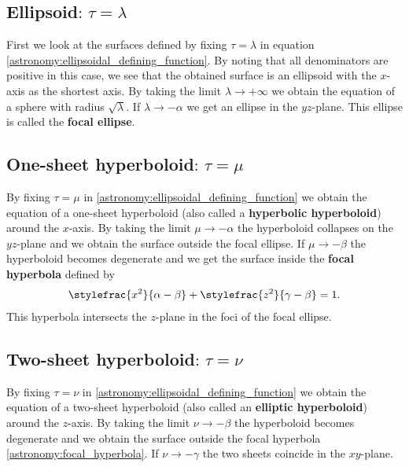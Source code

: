 \subsection{Ellipsoid\texorpdfstring{$\text{: }\tau = \lambda$}{}}

    First we look at the surfaces defined by fixing $\tau=\lambda$ in equation \ref{astronomy:ellipsoidal_defining_function}. By noting that all denominators are positive in this case, we see that the obtained surface is an ellipsoid with the $x$-axis as the shortest axis. By taking the limit $\lambda\rightarrow+\infty$ we obtain the equation of a sphere with radius $\sqrt{\lambda}$. If $\lambda\rightarrow-\alpha$ we get an ellipse in the $yz$-plane. This ellipse is called the \textbf{focal ellipse}.

\subsection{One-sheet hyperboloid\texorpdfstring{$\text{: }\tau = \mu$}{}}

    By fixing $\tau=\mu$ in \ref{astronomy:ellipsoidal_defining_function} we obtain the equation of a one-sheet hyperboloid (also called a \textbf{hyperbolic hyperboloid}) around the $x$-axis. By taking the limit $\mu\rightarrow-\alpha$ the hyperboloid collapses on the $yz$-plane and we obtain the surface outside the focal ellipse. If $\mu\rightarrow-\beta$ the hyperboloid becomes degenerate and we get the surface inside the \textbf{focal hyperbola} defined by
    \begin{gather}
        \label{astronomy:focal_hyperbola}
        \stylefrac{x^2}{\alpha-\beta} + \stylefrac{z^2}{\gamma-\beta} = 1.
    \end{gather}
    This hyperbola intersects the $z$-plane in the foci of the focal ellipse.

\subsection{Two-sheet hyperboloid\texorpdfstring{$\text{: }\tau = \nu$}{}}

    By fixing $\tau=\nu$ in \ref{astronomy:ellipsoidal_defining_function} we obtain the equation of a two-sheet hyperboloid (also called an \textbf{elliptic hyperboloid}) around the $z$-axis. By taking the limit $\nu\rightarrow-\beta$ the hyperboloid becomes degenerate and we obtain the surface outside the focal hyperbola \ref{astronomy:focal_hyperbola}. If $\nu\rightarrow-\gamma$ the two sheets coincide in the $xy$-plane.

